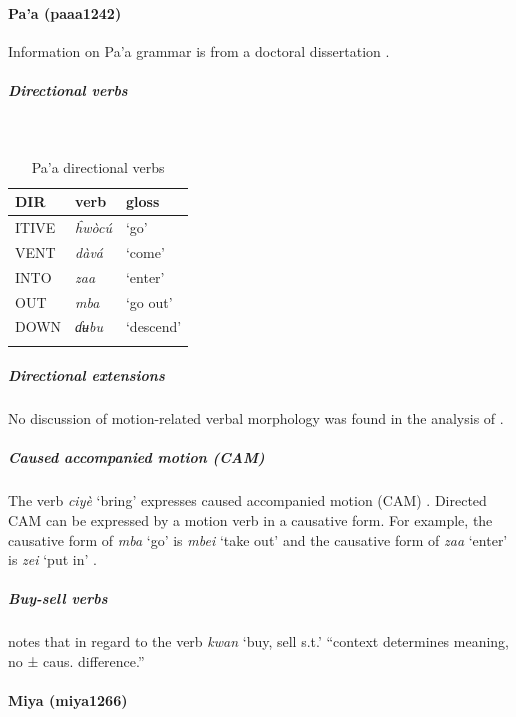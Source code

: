 \paragraph*{Pa'a (paaa1242)} \label{paaa}

Information on Pa'a grammar is from a doctoral dissertation \citep{skinnerAspectsPaanciGrammar1979}. 

\subparagraph{Directional verbs}~



\begin{table}[H]
	\caption{Pa'a directional verbs} 
	\label{tab:paaaV}
	\begin{tabular}{lll} %
		\lsptoprule
		DIR & verb & gloss   \\ %
		\midrule
		ITIVE & \textit{ĥwòcú} & `go' \\
		VENT & \textit{dàvá} & `come' \\ 
		INTO& \textit{zaa} & `enter' \\
		OUT & \textit{mba} & `go out' \\
		DOWN & \textit{ɗʉbu} & `descend' \\
		\lspbottomrule
	\end{tabular}
\end{table}

\subparagraph{Directional extensions}


No discussion of motion-related verbal morphology was found in the analysis of \citet{skinnerAspectsPaanciGrammar1979}.

\subparagraph{Caused accompanied motion (CAM)}



The verb \textit{ciyè} `bring' expresses caused accompanied motion (CAM) \citep[171]{skinnerAspectsPaanciGrammar1979}. Directed CAM can be expressed by a motion verb in a causative form. For example, the causative form of \textit{mba} `go' is \textit{mbei} `take out' and the causative form of \textit{zaa} `enter' is \textit{zei} `put in' \citep[131]{skinnerAspectsPaanciGrammar1979}. 

\subparagraph{Buy-sell verbs}



\citet[189]{skinnerAspectsPaanciGrammar1979} notes that in regard to the verb \textit{kwan} `buy, sell s.t.' ``context determines meaning, no ± caus. difference.'' 

\paragraph*{Miya (miya1266)}

